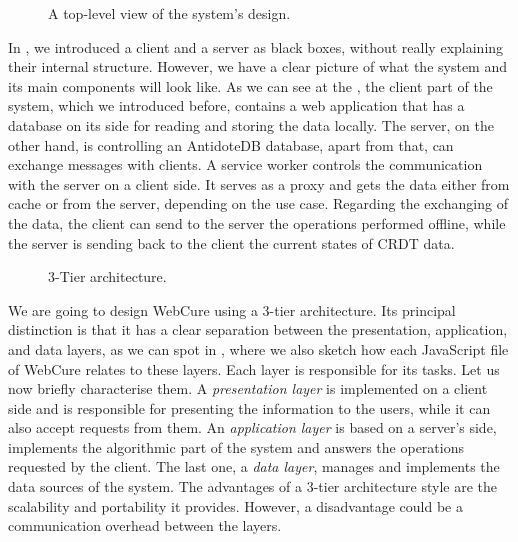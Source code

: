 \begin{figure}[!htb]
    \begin{center}
        \setlength{\fboxsep}{15pt}%
        \setlength{\fboxrule}{1pt}%
    \def\svgwidth{\linewidth}
    \fbox{}
    \caption {A top-level view of the system's design.}
    \label{fig:impl1}
\end{center}
\end{figure}

In , we introduced a client and a server as black boxes, without really explaining their internal structure. However, we have a clear picture of what the system and its main components will look like. As we can see at the , the client part of the system, which we introduced before, contains a web application that has a database on its side for reading and storing the data locally. The server, on the other hand, is controlling an AntidoteDB database, apart from that, can exchange messages with clients. A service worker controls the communication with the server on a client side. It serves as a proxy and gets the data either from cache or from the server, depending on the use case. Regarding the exchanging of the data, the client can send to the server the operations performed offline, while the server is sending back to the client the current states of CRDT data. 

\begin{figure}[!htb]
    \begin{center}
    \def\svgwidth{\linewidth}
    
    \caption {3-Tier architecture.}
    \label{fig:dev1}
\end{center}
\end{figure}

We are going to design WebCure using a 3-tier architecture\cite{51}. Its principal distinction is that it has a clear separation between the presentation, application, and data layers, as we can spot in , where we also sketch how each JavaScript file of WebCure relates to these layers. Each layer is responsible for its tasks. Let us now briefly characterise them. A \textit{presentation layer} is implemented on a client side and is responsible for presenting the information to the users, while it can also accept requests from them. An \textit{application layer} is based on a server's side, implements the algorithmic part of the system and answers the operations requested by the client. The last one, a \textit{data layer}, manages and implements the data sources of the system. The advantages of a 3-tier architecture style are the scalability and portability it provides. However, a disadvantage could be a communication overhead between the layers\cite{50}.

